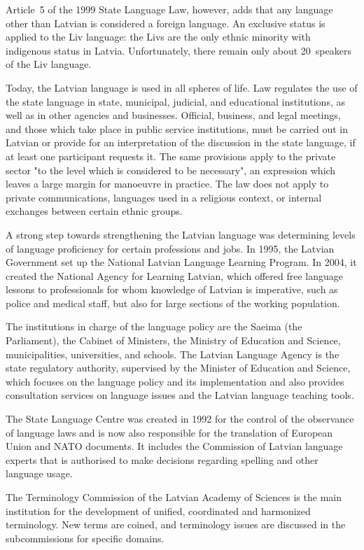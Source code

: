 \begin{multicols}{2}
Article~5 of the 1999 State Language Law, however, adds that any language other than Latvian is considered a foreign language.
An exclusive status is applied to the Liv language: the Livs are the only ethnic minority with indigenous status in Latvia.
Unfortunately, there remain only about 20~speakers of the Liv language.

Today, the Latvian language is used in all spheres of life.
Law regulates the use of the state language in state, municipal, judicial, and educational institutions, as well as in other agencies and businesses.
Official, business, and legal meetings, and those which take place in public service institutions, must be carried out in Latvian or provide for an interpretation of the discussion in the state language, if at least one participant requests it.
The same provisions apply to the private sector "to the level which is considered to be necessary", an expression which leaves a large margin for manoeuvre in practice.
The law does not apply to private communications, languages used in a religious context, or internal exchanges between certain ethnic groups.

A strong step towards strengthening the Latvian language was determining levels of language proficiency for certain professions and jobs.
In 1995, the Latvian Government set up the National Latvian Language Learning Program.
In 2004, it created the National Agency for Learning Latvian, which offered free language lessons to professionals for whom knowledge of Latvian is imperative, such as police and medical staff, but also for large sections of the working population.

The institutions in charge of the language policy are the Saeima (the Parliament), the Cabinet of Ministers, the Ministry of Education and Science, municipalities, universities, and schools.
The Latvian Language Agency is the state regulatory authority, supervised by the Minister of Education and Science, which focuses on the language policy and its implementation and also provides consultation services on language issues and the Latvian language teaching tools.

The State Language Centre was created in 1992 for the control of the observance of language laws and is now also responsible for the translation of European Union and NATO documents.
It includes the Commission of Latvian language experts that is authorised to make decisions regarding spelling and other language usage.

The Terminology Commission of the Latvian Academy of Sciences is the main institution for the development of unified, coordinated and harmonized terminology.
New terms are coined, and terminology issues are discussed in the subcommissions for specific domains.


\end{multicols}
